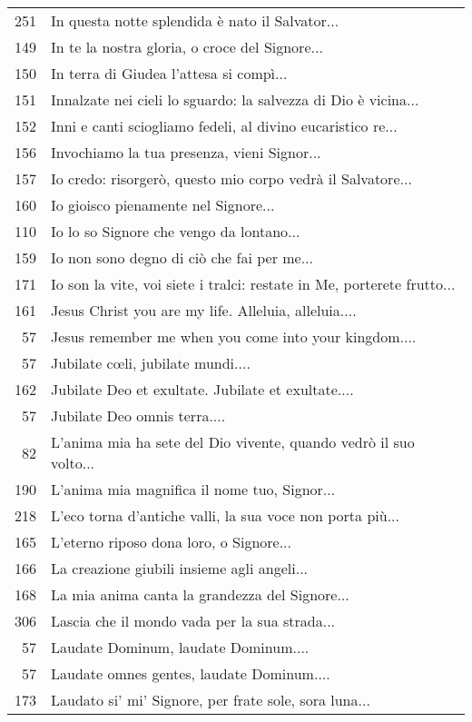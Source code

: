{\begin{flushleft}
\begin{longtable}{r m{11cm}}
    251 & In questa notte splendida è nato il Salvator...\\
    149 & In te la nostra gloria, o croce del Signore...\\
    150 & In terra di Giudea l'attesa si compì...\\
    151 & Innalzate nei cieli lo sguardo: la salvezza di Dio è vicina...\\
    152 & Inni e canti sciogliamo fedeli, al divino eucaristico re...\\
    156 & Invochiamo la tua presenza, vieni Signor...\\
    157 & Io credo: risorgerò, questo mio corpo vedrà il Salvatore...\\
    160 & Io gioisco pienamente nel Signore...\\
    110 & Io lo so Signore che vengo da lontano...\\
    159 & Io non sono degno di ciò che fai per me...\\
    171 & Io son la vite, voi siete i tralci: restate in Me, porterete frutto...\\
    161 & Jesus Christ you are my life. Alleluia, alleluia....\\
    57 & Jesus remember me when you come into your kingdom....\\
    57 & Jubilate c\oe li, jubilate mundi....\\
    162 & Jubilate Deo et exultate.  Jubilate et exultate....\\
    57 & Jubilate Deo omnis terra....\\
    82 & L'anima mia ha sete del Dio vivente, quando vedrò il suo volto...\\
    190 & L'anima mia magnifica il nome tuo, Signor...\\
    218 & L'eco torna d'antiche valli, la sua voce non porta più...\\
    165 & L'eterno riposo dona loro, o Signore...\\
    166 & La creazione giubili insieme agli angeli...\\
    168 & La mia anima canta la grandezza del Signore...\\
    306 & Lascia che il mondo vada per la sua strada...\\
    57 & Laudate Dominum, laudate Dominum....\\
    57 & Laudate omnes gentes, laudate Dominum....\\
    173 & Laudato si' mi' Signore, per frate sole, sora luna...\\

\end{longtable}
\end{flushleft}}
